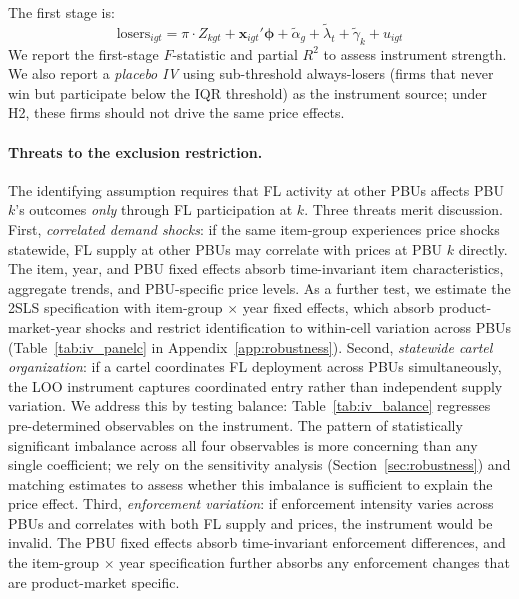 The first stage is:
\begin{equation}
  \text{losers}_{igt} = \pi \cdot Z_{kgt} + \mathbf{x}_{igt}'
  \boldsymbol{\phi} + \tilde{\alpha}_g + \tilde{\lambda}_t +
  \tilde{\gamma}_k + u_{igt}
  \label{eq:first_stage}
\end{equation}
We report the first-stage $F$-statistic and partial $R^2$ to assess
instrument strength. We also report a \emph{placebo IV} using
sub-threshold always-losers (firms that never win but participate below
the IQR threshold) as the instrument source; under H2, these firms
should not drive the same price effects.

\paragraph{Threats to the exclusion restriction.}
The identifying assumption requires that FL activity at other PBUs
affects PBU $k$'s outcomes \emph{only} through FL participation at $k$.
Three threats merit discussion. First, \emph{correlated demand shocks}:
if the same item-group experiences price shocks statewide, FL supply at
other PBUs may correlate with prices at PBU $k$ directly. The item,
year, and PBU fixed effects absorb time-invariant item characteristics,
aggregate trends, and PBU-specific price levels. As a further test, we
estimate the 2SLS specification with item-group $\times$ year fixed
effects, which absorb product-market-year shocks and restrict
identification to within-cell variation across PBUs
(Table~\ref{tab:iv_panelc} in Appendix~\ref{app:robustness}). Second, \emph{statewide cartel
organization}: if a cartel coordinates FL deployment across PBUs
simultaneously, the LOO instrument captures coordinated entry rather than
independent supply variation. We address this by testing balance: %
Table~\ref{tab:iv_balance} regresses pre-determined observables on the
instrument. The pattern of statistically significant imbalance across
all four observables is more concerning than any single coefficient;
we rely on the sensitivity analysis
(Section~\ref{sec:robustness}) and matching estimates to assess
whether this imbalance is sufficient to explain the price effect. Third, \emph{enforcement variation}: if
enforcement intensity varies across PBUs and correlates with both FL
supply and prices, the instrument would be invalid. The PBU fixed effects
absorb time-invariant enforcement differences, and the item-group
$\times$ year specification further absorbs any enforcement changes that
are product-market specific.


